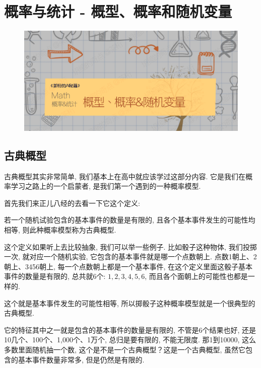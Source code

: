 \chapter{概率与统计 - 概型、概率和随机变量}

\begin{figure}[ht]
  \centering
  \includegraphics[width=1\linewidth]{asset/茶桁的AI秘籍_Math_20.png}
\end{figure}

\newpage

\section{古典概型}

古典概型其实非常简单, 我们基本上在高中就应该学过这部分内容. 它是我们在概率学习之路上的一个启蒙者, 是我们第一个遇到的一种概率模型. 

首先我们来正儿八经的去看一下它这个定义: 

\begin{newquotation}
若一个随机试验包含的基本事件的数量是有限的, 且各个基本事件发生的可能性均相等, 则此种概率模型称为古典概型. 
\end{newquotation}

这个定义如果听上去比较抽象, 我们可以举一些例子. 比如骰子这种物体, 我们投掷一次, 就对应一个随机实验, 它包含的基本事件就是哪一个点数朝上. 点数1朝上、2朝上、3456朝上, 每一个点数朝上都是一个基本事件, 在这个定义里面这骰子基本事件的数量是有限的, 总共就6个: $1, 2, 3, 4, 5, 6$, 而且各个面朝上的可能性也都是一样的. 

这个就是基本事件发生的可能性相等, 所以掷骰子这种概率模型就是一个很典型的古典概型. 

它的特征其中之一就是包含的基本事件的数量是有限的, 不管是6个结果也好, 还是10几个、100个、1,000个、1万个, 总归是要有限的, 不能无限度. 那1到10000, 这么多数里面随机抽一个数, 这个是不是一个古典概型？这是一个古典概型, 虽然它包含的基本事件数量非常多, 但是仍然是有限的. 

